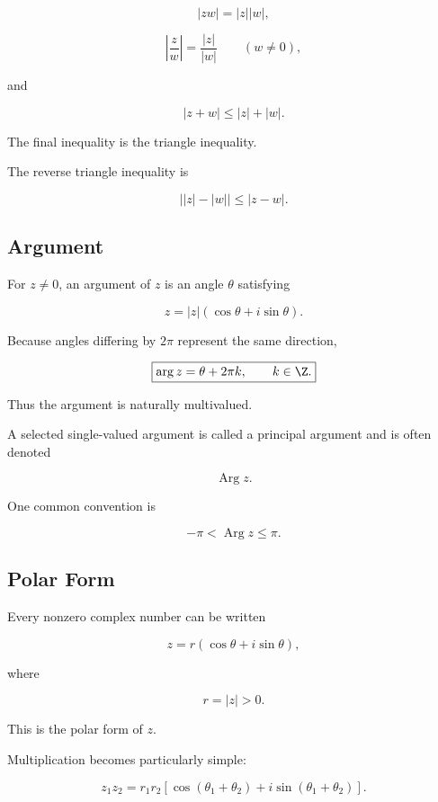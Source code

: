 \[
\boxed{
|zw|=|z||w|,
}
\]

\[
\boxed{
\left|\frac{z}{w}\right|
=
\frac{|z|}{|w|}
\qquad (w\neq0),
}
\]

and

\[
\boxed{
|z+w|
\leq
|z|+|w|.
}
\]

The final inequality is the triangle inequality.

The reverse triangle inequality is

\[
\boxed{
\bigl||z|-|w|\bigr|
\leq
|z-w|.
}
\]

\subsection{Argument}
\label{subsec:complex-argument}

For \(z\neq0\), an argument of \(z\) is an angle \(\theta\) satisfying

\[
z
=
|z|
(\cos\theta+i\sin\theta).
\]

Because angles differing by \(2\pi\) represent the same direction,

\[
\boxed{
\arg z
=
\theta+2\pi k,
\qquad
k\in\Z.
}
\]

Thus the argument is naturally multivalued.

A selected single-valued argument is called a principal argument and is
often denoted

\[
\boxed{
\operatorname{Arg}z.
}
\]

One common convention is

\[
-\pi<\operatorname{Arg}z\leq\pi.
\]

\subsection{Polar Form}
\label{subsec:complex-polar-form}

Every nonzero complex number can be written

\[
\boxed{
z
=
r(\cos\theta+i\sin\theta),
}
\]

where

\[
r=|z|>0.
\]

This is the polar form of \(z\).

Multiplication becomes particularly simple:

\[
z_1z_2
=
r_1r_2
\left[
\cos(\theta_1+\theta_2)
+
i\sin(\theta_1+\theta_2)
\right].
\]

